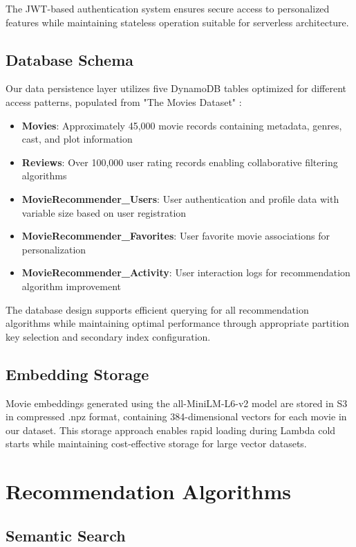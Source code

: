 \documentclass[conference]{IEEEtran}
\begin{document}
The JWT-based authentication system ensures secure access to personalized features while maintaining stateless operation suitable for serverless architecture.

\subsection{Database Schema}

Our data persistence layer utilizes five DynamoDB tables optimized for different access patterns, populated from "The Movies Dataset" \cite{movies_dataset}:

\begin{itemize}
\item \textbf{Movies}: Approximately 45,000 movie records containing metadata, genres, cast, and plot information
\item \textbf{Reviews}: Over 100,000 user rating records enabling collaborative filtering algorithms
\item \textbf{MovieRecommender\_Users}: User authentication and profile data with variable size based on user registration
\item \textbf{MovieRecommender\_Favorites}: User favorite movie associations for personalization
\item \textbf{MovieRecommender\_Activity}: User interaction logs for recommendation algorithm improvement
\end{itemize}

The database design supports efficient querying for all recommendation algorithms while maintaining optimal performance through appropriate partition key selection and secondary index configuration.

\subsection{Embedding Storage}

Movie embeddings generated using the all-MiniLM-L6-v2 model are stored in S3 in compressed .npz format, containing 384-dimensional vectors for each movie in our dataset. This storage approach enables rapid loading during Lambda cold starts while maintaining cost-effective storage for large vector datasets.

\section{Recommendation Algorithms}

\subsection{Semantic Search}
\end{document}
